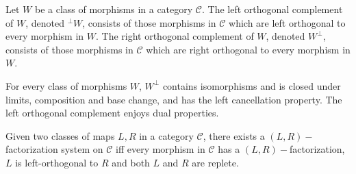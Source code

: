 \begin{definition}
  \leanok
  Let $W$ be a class of morphisms in a category $\mathcal{C}$. The left orthogonal complement of $W$, denoted ${}^{\bot}W$, consists of those morphisms in $\mathcal{C}$ which are left orthogonal to every morphism in $W$. The right orthogonal complement of $W$, denoted $W^\bot$, consists of those morphisms in $\mathcal{C}$ which are right orthogonal to every morphism in $W$.
\end{definition}

\begin{lemma}
  \leanok
  For every class of morphisms $W$, $W^\bot$ contains isomorphisms and is closed under limits, composition and base change, and has the left cancellation property. The left orthogonal complement enjoys dual properties.
\end{lemma}

\begin{theorem}
  \leanok
  Given two classes of maps $L,R$ in a category $\mathcal{C}$, there exists a $(L,R)-$factorization system on $\mathcal{C}$ iff every morphism in $\mathcal{C}$ has a $(L,R)-$factorization, $L$ is left-orthogonal to $R$ and both $L$ and $R$ are replete.
\end{theorem}